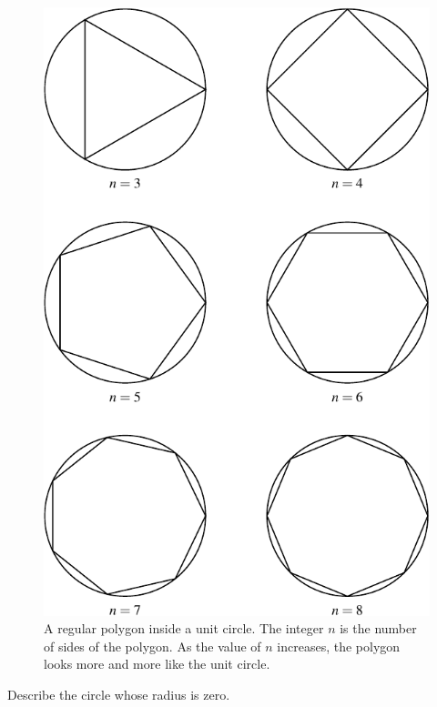 \documentclass[a4paper,oneside,12pt]{article}
\begin{document}
\begin{figure}[!htbp]
\centering
\includegraphics[scale=1]{image/05/circle-polygon.pdf}
\caption{%
  A regular polygon inside a unit circle.  The integer $n$ is the
  number of sides of the polygon.  As the value of $n$ increases, the
  polygon looks more and more like the unit circle.
}
\label{fig:unit_circle_inscribed_regular_polygon}
\end{figure}

\begin{exercise}
Describe the circle whose radius is zero.
\end{exercise}

\end{document}
